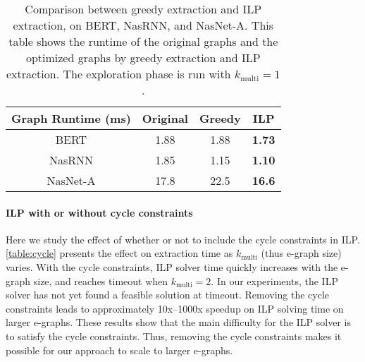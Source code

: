 \begin{table}[]
    \centering
    \begin{tabular}{cccc}
    \hline
        {\bf Graph Runtime (ms)} & {\bf Original} & {\bf Greedy} & {\bf ILP} \\
    \hline
        BERT & 1.88 & 1.88 & \textbf{1.73} \\
        NasRNN & 1.85 & 1.15 & \textbf{1.10} \\
        NasNet-A & 17.8 & 22.5 & \textbf{16.6} \\
    \hline
    \end{tabular}
    \caption{Comparison between greedy extraction and ILP extraction, on BERT, NasRNN, and NasNet-A.
    This table shows the runtime of the original graphs and the optimized graphs by greedy extraction and ILP extraction.
    The exploration phase is run with $k_{\textrm{multi}} = 1$. }
    \label{table:extraction}
\end{table}

\paragraph{ILP with or without cycle constraints}

Here we study the effect of whether or not to include the cycle constraints in ILP.
\autoref{table:cycle} presents the effect on extraction time as $k_{\textrm{multi}}$ (thus e-graph size) varies.
With the cycle constraints, ILP solver time quickly increases with the e-graph size, and reaches timeout when $k_{\textrm{multi}}=2$.
In our experiments, the ILP solver has not yet found a feasible solution at timeout.
Removing the cycle constraints leads to approximately 10x--1000x speedup on ILP solving time on larger e-graphs.
These results show that the main difficulty for the ILP solver is to satisfy the cycle constraints.
Thus, removing the cycle constraints makes it possible for our approach to scale to larger e-graphs.

